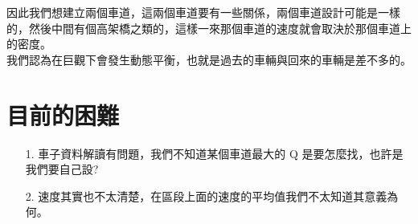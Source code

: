 \documentclass[a4paper,12pt]{report}
\begin{document}
\begin{CJK*}{UTF8}{bkai}
因此我們想建立兩個車道，這兩個車道要有一些關係，兩個車道設計可能是一樣的，然後中間有個高架橋之類的，這樣一來那個車道的速度就會取決於那個車道上的密度。\\

我們認為在巨觀下會發生動態平衡，也就是過去的車輛與回來的車輛是差不多的。

\section{目前的困難}

\begin{itemize}
\item[1.] 車子資料解讀有問題，我們不知道某個車道最大的 Q 是要怎麼找，也許是我們要自己設?\\

\item[2.] 速度其實也不太清楚，在區段上面的速度的平均值我們不太知道其意義為何。
\end{itemize}

\end{CJK*}
\end{document}
